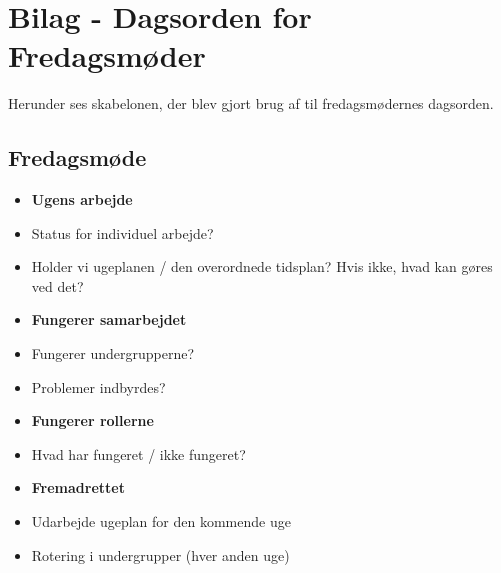 \chapter{Bilag - Dagsorden for Fredagsmøder} \label{Bilag4}
Herunder ses skabelonen, der blev gjort brug af til fredagsmødernes dagsorden.
  
\section{Fredagsmøde}
\begin{itemize}
\item \textbf{Ugens arbejde}
\indent \item Status for individuel arbejde?
\indent \item Holder vi ugeplanen / den overordnede tidsplan? Hvis ikke, hvad kan gøres ved det?
\item \textbf{Fungerer samarbejdet}
\indent \item Fungerer undergrupperne?
\indent \item Problemer indbyrdes?
\item \textbf{Fungerer rollerne}
\indent \item Hvad har fungeret / ikke fungeret?
\item \textbf{Fremadrettet}
\indent \item Udarbejde ugeplan for den kommende uge 
\indent \item Rotering i undergrupper (hver anden uge)
\end{itemize}